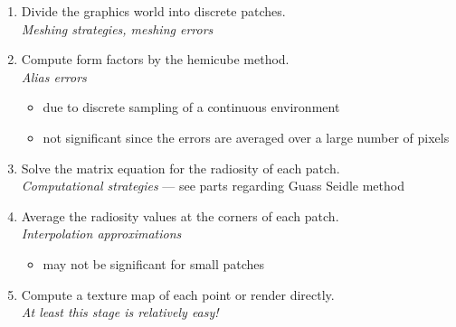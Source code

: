 \documentclass[twocolumn,landscape,10pt]{article}
\theoremstyle{definition}
\begin{document}
\begin{enumerate}
    \item Divide the graphics world into discrete patches. \\
        \emph{Meshing strategies, meshing errors}
    \item Compute form factors by the hemicube method. \\
        \emph{Alias errors} 
        \begin{itemize}
            \item due to discrete sampling of a continuous
                environment
            \item not significant since the errors are averaged over a large
                number of pixels
        \end{itemize} 
    \item Solve the matrix equation for the radiosity of each patch. \\
        \emph{Computational strategies} 
        --- see parts regarding Guass Seidle method
    \item Average the radiosity values at the corners of each patch. \\
        \emph{Interpolation approximations}
        \begin{itemize}
            \item may not be significant for small patches
        \end{itemize} 
    \item Compute a texture map of each point or render directly. \\
        \emph{At least this stage is relatively easy!}
\end{enumerate} 
\end{document}
